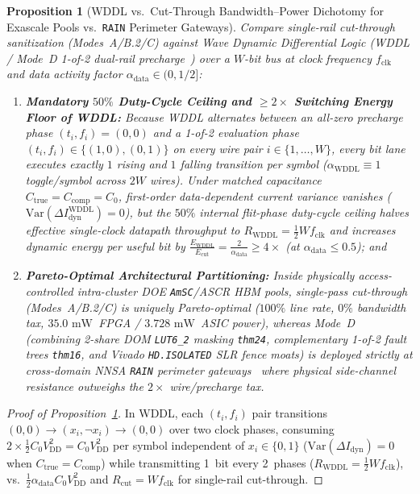 \documentclass[10pt,twocolumn]{article}
\providecommand{\CorePowerMw}{\ensuremath{35.0\text{~mW}}}
\providecommand{\AsicTotalPowerMw}{\ensuremath{3.728\text{~mW}}}
\providecommand{\PostRouteDynPowerMW}{\CorePowerMw}
\theoremstyle{spectralthm}
\newtheorem{proposition}[theorem]{Proposition}
\begin{document}
\begin{proposition}[WDDL vs.\ Cut-Through Bandwidth--Power Dichotomy for Exascale Pools vs.\ \texttt{RAIN} Perimeter Gateways]
\label{prop:wddl_dichotomy}
Compare single-rail cut-through sanitization (Modes~A/B.2/C) against Wave Dynamic Differential Logic (WDDL / Mode~D 1-of-2 dual-rail precharge~\cite{gross2016dom}) over a $W$-bit bus at clock frequency $f_{\mathrm{clk}}$ and data activity factor $\alpha_{\mathrm{data}} \in (0, 1/2]$:
\begin{enumerate}
  \item[(i)] \textbf{Mandatory $50\%$ Duty-Cycle Ceiling and $\ge 2\times$ Switching Energy Floor of WDDL:} Because WDDL alternates between an all-zero precharge phase $(t_i, f_i) = (0,0)$ and a 1-of-2 evaluation phase $(t_i, f_i) \in \{(1,0), (0,1)\}$ on every wire pair $i \in \{1,\ldots,W\}$, every bit lane executes exactly $1$ rising and $1$ falling transition per symbol ($\alpha_{\mathrm{WDDL}} \equiv 1$ toggle/symbol across $2W$ wires). Under matched capacitance $C_{\mathrm{true}} = C_{\mathrm{comp}} = C_0$, first-order data-dependent current variance vanishes ($\mathrm{Var}(\Delta I_{\mathrm{dyn}}^{\mathrm{WDDL}}) = 0$), but the $50\%$ internal flit-phase duty-cycle ceiling halves effective single-clock datapath throughput to $R_{\mathrm{WDDL}} = \frac{1}{2} W f_{\mathrm{clk}}$ and increases dynamic energy per useful bit by $\frac{E_{\mathrm{WDDL}}}{E_{\mathrm{cut}}} = \frac{2}{\alpha_{\mathrm{data}}} \ge 4\times$ (at $\alpha_{\mathrm{data}} \le 0.5$); and
  \item[(ii)] \textbf{Pareto-Optimal Architectural Partitioning:} Inside physically access-controlled intra-cluster DOE \texttt{AmSC}/ASCR HBM pools, single-pass cut-through (Modes~A/B.2/C) is uniquely Pareto-optimal ($100\%$ line rate, $0\%$ bandwidth tax, \PostRouteDynPowerMW\ FPGA / \AsicTotalPowerMw\ ASIC power), whereas Mode~D (combining 2-share DOM \mbox{\texttt{LUT6\_2}} masking \texttt{thm24}, complementary 1-of-2 fault trees \texttt{thm16}, and Vivado \texttt{HD.ISOLATED} SLR fence moats) is deployed strictly at cross-domain NNSA \texttt{RAIN} perimeter gateways~\cite{ncdsmo2020rain} where physical side-channel resistance outweighs the $2\times$ wire/precharge tax.
\end{enumerate}
\end{proposition}
\begin{proof}[Proof of Proposition~\ref{prop:wddl_dichotomy}]
In WDDL, each $(t_i, f_i)$ pair transitions $(0,0) \rightarrow (x_i, \neg x_i) \rightarrow (0,0)$ over two clock phases, consuming $2 \times \frac{1}{2} C_0 V_{\mathrm{DD}}^2 = C_0 V_{\mathrm{DD}}^2$ per symbol independent of $x_i \in \{0,1\}$ ($\mathrm{Var}(\Delta I_{\mathrm{dyn}}) = 0$ when $C_{\mathrm{true}} = C_{\mathrm{comp}}$) while transmitting 1~bit every 2~phases ($R_{\mathrm{WDDL}} = \frac{1}{2} W f_{\mathrm{clk}}$), vs.\ $\frac{1}{2}\alpha_{\mathrm{data}} C_0 V_{\mathrm{DD}}^2$ and $R_{\mathrm{cut}} = W f_{\mathrm{clk}}$ for single-rail cut-through.
\end{proof}
\end{document}
